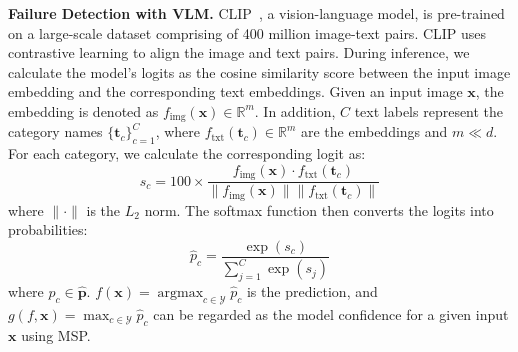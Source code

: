 \noindent\textbf{Failure Detection with VLM.} \label{subsec:zs}
CLIP~\cite{Radford2021LearningTV}, a vision-language model, is pre-trained on a large-scale dataset comprising of 400 million image-text pairs. 
CLIP uses contrastive learning to align the image and text pairs. 
During inference, we calculate the model's logits as the cosine similarity score between the input image embedding and the corresponding text embeddings. 
Given an input image $\mathbf{x}$, the embedding is denoted as $f_{\text{img}}(\mathbf{x}) \in \mathbb{R}^m$. 
In addition, $C$ text labels represent the category names $\{ \mathbf{t}_c \}_{c=1}^C$, where $f_{\text{txt}}(\mathbf{t}_c) \in \mathbb{R}^m$ are the embeddings and $m \ll d$. 
For each category, we calculate the corresponding logit as:
\begin{equation} \label{eq:simscore}
    s_c = 100 \times \frac{f_{\text{img}}(\mathbf{x}) \cdot f_{\text{txt}}(\mathbf{t}_c)}{\lVert f_{\text{img}}(\mathbf{x}) \rVert \lVert f_{\text{txt}}(\mathbf{t}_c) \rVert}
\end{equation}
where $\lVert \cdot \rVert$ is the $L_2$ norm. 
The softmax function then converts the logits into probabilities:
\begin{equation} \label{eq:softmax}
    \hat{p}_c = \frac{\exp({s_c})}{\sum_{j=1}^{C} \exp({s_j})}
\end{equation}
where $\hat{p}_c \in \boldsymbol{\hat{p}}$. $f(\mathbf{x}) = \operatorname{argmax}_{c \in \mathcal{Y}} \hat{p}_c$ is the prediction, and $g(f, \mathbf{x}) = \max_{c \in \mathcal{Y}} \hat{p}_c$ can be regarded as the model confidence for a given input $\mathbf{x}$ using MSP. 